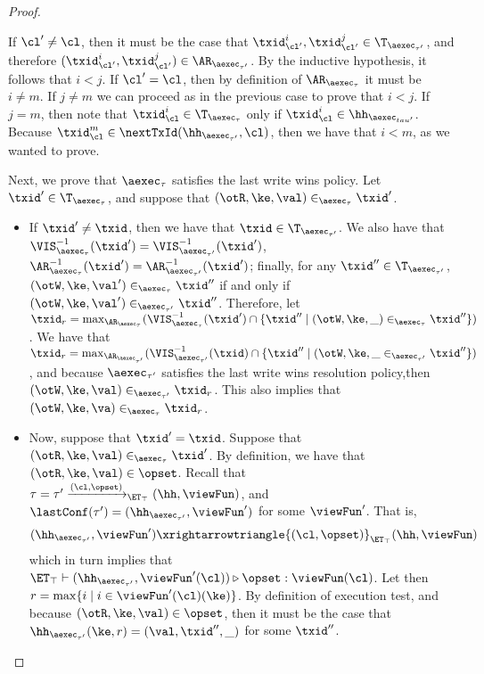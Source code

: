 \begin{proof}
\begin{itemize}
\begin{itemize}
If $\cl' \neq \cl$, then it must be the case that $\txid_{\cl'}^{i}, \txid_{\cl'}^{j} \in \T_{\aexec_{\tau'}}$, 
and therefore $(\txid_{\cl'}^{i}, \txid_{\cl'}^{j}) \in \AR_{\aexec_{\tau'}}$. By the inductive hypothesis, 
it follows that $i < j$. If $\cl' = \cl$, then by definition of $\AR_{\aexec_{\tau}}$ it must be  $i \neq m$. 
If $j \neq m$ we can proceed as in the previous case to prove that $i < j$. If $j = m$, then 
note that $\txid_{\cl}^{i} \in \T_{\aexec_{\tau}}$ only if $\txid_{\cl}^{i} \in \hh_{\aexec_{tau'}}$. 
Because $\txid_{\cl}^{m} \in \nextTxId(\hh_{\aexec_{\tau'}}, \cl)$, then we have that $i < m$, 
as we wanted to prove.
\end{itemize}

Next, we prove that $\aexec_{\tau}$ satisfies the last write wins policy. 
Let $\txid' \in \T_{\aexec_{\tau}}$, and suppose that $(\otR, \ke, \val) \in_{\aexec_{\tau}} \txid'$. 
\begin{itemize} 
\item If $\txid' \neq \txid$, then we have that $\txid \in \T_{\aexec_{\tau'}}$. We also have that 
$\VIS^{-1}_{\aexec_{\tau}}(\txid') = \VIS^{-1}_{\aexec_{\tau'}}(\txid')$, $\AR^{-1}_{\aexec_{\tau}}(\txid') 
= \AR^{-1}_{\aexec_{\tau'}}(\txid')$; finally, for any $\txid'' \in \T_{\aexec_{\tau'}}$, 
$(\otW, \ke, \val') \in_{\aexec_{\tau}} \txid''$ if and only if $(\otW, \ke, \val') \in_{\aexec_{\tau'}} 
\txid''$. Therefore, let $\txid_{r} = \max_{\AR_{\aexec_{\tau}}}(\VIS^{-1}_{\aexec_{\tau}}(\txid') \cap 
\{\txid'' \mid (\otW, \ke, \_) \in_{\aexec_{\tau}} \txid''\})$. We have that $\txid_{r} = \max_{\AR_{\aexec_{\tau'}}}(\VIS^{-1}_{\aexec_{\tau'}}(\txid) 
\cap \{ \txid'' \mid (\otW, \ke, \_ \in_{\aexec_{\tau'}} \txid''\})$, and because $\aexec_{\tau'}$ satisfies the last write 
wins resolution policy,then $(\otW, \ke, \val) \in_{\aexec_{\tau'}} \txid_{r}$. This also implies that 
$(\otW, \ke, \va) \in_{\aexec_{\tau}} \txid_{r}$. 

\item Now, suppose that $\txid' = \txid$. Suppose that $(\otR, \ke, \val) \in_{\aexec_{\tau}} \txid'$. 
By definition, we have that $(\otR, \ke, \val) \in \opset$. Recall that $\tau = \tau' \xrightarrow{(\cl, \opset)}_{\ET_{\top}} (\hh, \viewFun)$, 
and $\lastConf(\tau') = (\hh_{\aexec_{\tau'}}, \viewFun')$ for some $\viewFun'$. 
That is, 
\[
    (\hh_{\aexec_{\tau'}}, \viewFun') \xrightarrowtriangle{(\cl, \opset)}_{\ET_{\top}} (\hh, \viewFun)
\]
which in turn implies that $\ET_{\top} \vdash (\hh_{\aexec_{\tau'}}, \viewFun'(\cl)) \triangleright \opset : \viewFun(\cl)$. 
Let then $r = \max\{i \mid  i \in \viewFun'(\cl)(\ke)\}$. 
By definition of execution test, and because $(\otR, \ke, \val) \in \opset$, then it must be the case that 
$\hh_{\aexec_{\tau'}}(\ke, r) = (\val, \txid'', \_)$ for some $\txid''$. 


\end{itemize}
\end{itemize}
\end{proof}
